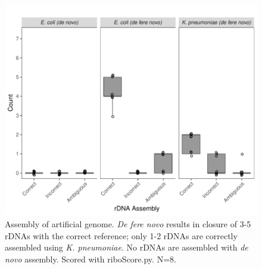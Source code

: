 \documentclass[10pt]{article}
\begin{document}
\begin{figure}[!h]
    \centering
    \hspace*{0cm}\includegraphics[width=.60\textwidth]{simulated_genome}
    \caption{Assembly of artificial genome. \textit{De fere novo} results in closure of 3-5 rDNAs with the correct reference; only 1-2 rDNAs are correctly assembled using \textit{K. pneumoniae}.  No rDNAs are assembled with \textit{de novo} assembly. Scored with riboScore.py. N=8.}
    \label{fig:simgenome}
\end{figure}
\end{document}
